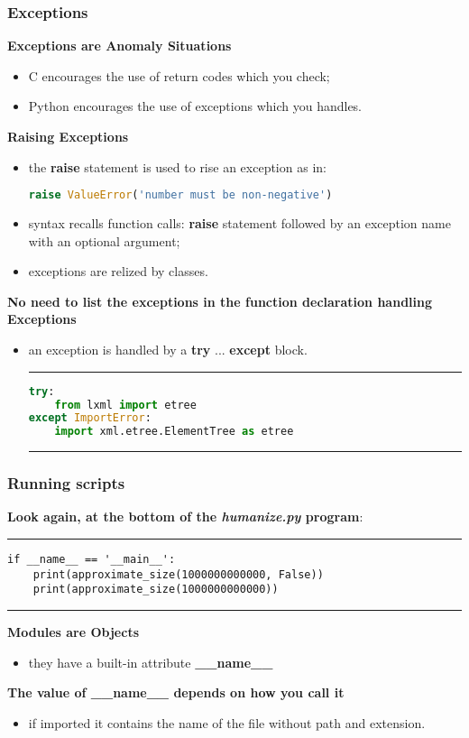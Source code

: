 \subsubsection{Exceptions}
\textbf{Exceptions are Anomaly Situations}
\begin{itemize}
	\item C encourages the use of return codes which you check;
	\item Python encourages the use of exceptions which you handles.
\end{itemize}
\textbf{Raising Exceptions}
\begin{itemize}
	\item the \textbf{raise} statement is used to rise an exception as in:
\begin{lstlisting}[language=Python]
raise ValueError('number must be non-negative')
\end{lstlisting}
	\item syntax recalls function calls: \textbf{raise} statement followed by an exception name with an optional argument;
	\item exceptions are relized by classes.
\end{itemize}
\textbf{No need to list the exceptions in the function declaration handling Exceptions}
\begin{itemize}
	\item an exception is handled by a \textbf{try} ... \textbf{except} block.
\hrule
\begin{lstlisting}[language=Python]
try:
	from lxml import etree
except ImportError:
	import xml.etree.ElementTree as etree
\end{lstlisting}
\hrule
\end{itemize}

\subsubsection{Running scripts}
\textbf{Look again, at the bottom of the \textit{humanize.py} program}:
\hrule
\begin{lstlisting}
if __name__ == '__main__':
	print(approximate_size(1000000000000, False))
	print(approximate_size(1000000000000))
\end{lstlisting}
\hrule
\textbf{Modules are Objects}
\begin{itemize}
	\item they have a built-in attribute \textbf{\_\_name\_\_}
\end{itemize}
\textbf{The value of \textbf{\_\_name\_\_} depends on how you call it}
\begin{itemize}
	\item if imported it contains the name of the file without path and extension.
\end{itemize}

